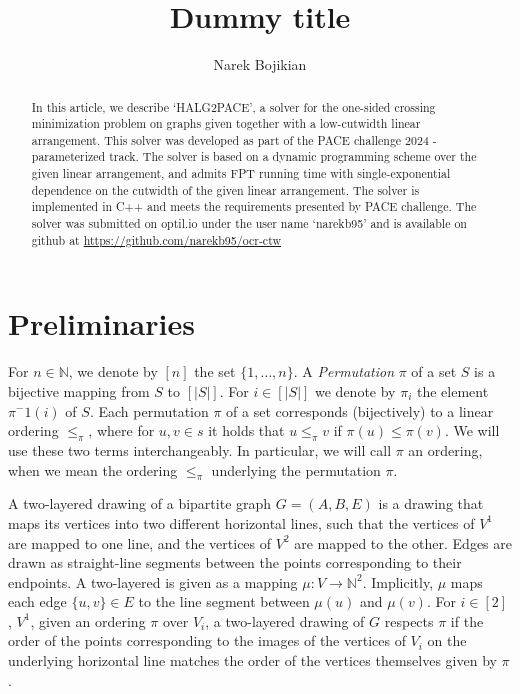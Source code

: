 \documentclass[a4paper,UKenglish,cleveref, autoref, thm-restate]{lipics-v2021}
\title{Dummy title} %
\author{Narek Bojikian}{Humboldt University of Berlin, Germany}{bojikian@informatik.hu-berlin.de}{[todo]}{}%
\begin{document}
\maketitle

\begin{abstract}
    In this article, we describe `HALG2PACE', a solver for the one-sided crossing minimization problem on graphs given together with a low-cutwidth linear arrangement. 
    This solver was developed as part of the PACE challenge 2024 - parameterized track. The solver is based on a dynamic programming scheme over the given linear arrangement, and admits FPT running time with single-exponential dependence on the cutwidth of the given linear arrangement. The solver is implemented in C++ and meets the requirements presented by PACE challenge. The solver was submitted on optil.io under the user name `narekb95' and is available on github at \url{https://github.com/narekb95/ocr-ctw}
\end{abstract}
\section{Preliminaries}
For $n\in \mathbb{N}$, we denote by $[n]$ the set $\{1,\dots,n\}$.
A \emph{Permutation} $\pi$ of a set $S$ is a bijective mapping from $S$ to $[|S|]$. For $i\in[|S|]$ we denote by $\pi_i$ the element $\pi^-1(i)$ of $S$. Each permutation $\pi$ of a set corresponds (bijectively) to a linear ordering $\leq_{\pi}$, where for $u,v\in s$ it holds that $u\leq_{\pi} v$ if $\pi(u)\leq \pi(v)$. We will use these two terms interchangeably. In particular, we will call $\pi$ an ordering, when we mean the ordering $\leq_{\pi}$ underlying the permutation $\pi$.

A two-layered drawing of a bipartite graph $G=(A,B,E)$ is a drawing that maps its vertices into two different horizontal lines, such that the vertices of $V^1$ are mapped to one line, and the vertices of $V^2$ are mapped to the other. Edges are drawn as straight-line segments between the points corresponding to their endpoints. A two-layered is given as a mapping $\mu\colon V\rightarrow \mathbb{N}^2$. Implicitly, $\mu$ maps each edge $\{u,v\} \in E$ to the line segment between $\mu(u)$ and $\mu(v)$.
For $i\in[2]$, $V^1$, given an ordering $\pi$ over $V_i$, a two-layered drawing of $G$ respects $\pi$ if the order of the points corresponding to the images of the vertices of $V_i$ on the underlying horizontal line matches the order of the vertices themselves given by $\pi$.
\end{document}
